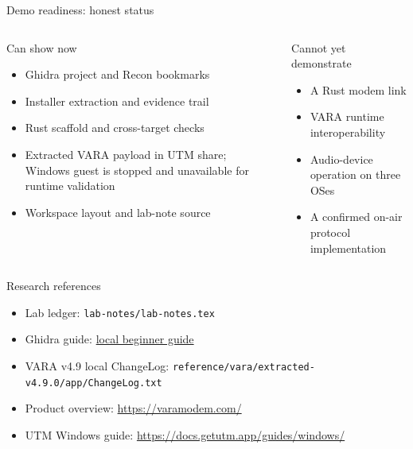 \documentclass[20pt]{beamer}
\begin{document}
\begin{frame}{Demo readiness: honest status}
  \begin{columns}[T]
      \begin{block}{Can show now}
        \begin{itemize}
          \item Ghidra project and Recon bookmarks
          \item Installer extraction and evidence trail
          \item Rust scaffold and cross-target checks
          \item Extracted VARA payload in UTM share; Windows guest is stopped
                and unavailable for runtime validation
          \item Workspace layout and lab-note source
        \end{itemize}
      \end{block}
      \begin{alertblock}{Cannot yet demonstrate}
        \begin{itemize}
          \item A Rust modem link
          \item VARA runtime interoperability
          \item Audio-device operation on three OSes
          \item A confirmed on-air protocol implementation
        \end{itemize}
      \end{alertblock}
  \end{columns}
\end{frame}

\begin{frame}{Research references}
  \small
  \begin{itemize}
    \item Lab ledger: \texttt{lab-notes/lab-notes.tex}
    \item Ghidra guide:
          \href{../reference/ghidra/docs/GhidraClass/Beginner/Introduction_to_Ghidra_Student_Guide.html}{local beginner guide}
    \item VARA v4.9 local ChangeLog:
          \texttt{reference/vara/extracted-v4.9.0/app/ChangeLog.txt}
    \item Product overview: \url{https://varamodem.com/}
    \item UTM Windows guide: \url{https://docs.getutm.app/guides/windows/}
  \end{itemize}
\end{frame}
\end{document}
